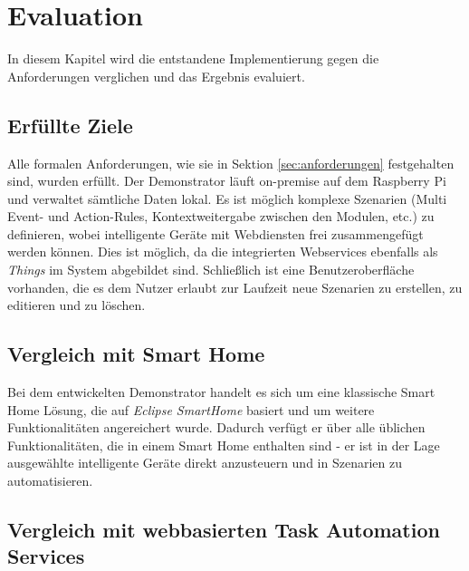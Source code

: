 \chapter{Evaluation}
\label{chap:eval}
In diesem Kapitel wird die entstandene Implementierung gegen die Anforderungen verglichen und das Ergebnis evaluiert.

\section{Erfüllte Ziele}
Alle formalen Anforderungen, wie sie in Sektion \ref{sec:anforderungen} festgehalten sind, wurden erfüllt. Der Demonstrator läuft on-premise auf dem Raspberry Pi und verwaltet sämtliche Daten lokal. Es ist möglich komplexe Szenarien (Multi Event- und Action-Rules, Kontextweitergabe zwischen den Modulen, etc.) zu definieren, wobei intelligente Geräte mit Webdiensten frei zusammengefügt werden können. Dies ist möglich, da die integrierten Webservices ebenfalls als \textit{Things} im System abgebildet sind. Schließlich ist eine Benutzeroberfläche vorhanden, die es dem Nutzer erlaubt zur Laufzeit neue Szenarien zu erstellen, zu editieren und zu löschen.

\section{Vergleich mit Smart Home}
Bei dem entwickelten Demonstrator handelt es sich um eine klassische Smart Home Lösung, die auf \textit{Eclipse SmartHome} basiert und um weitere Funktionalitäten angereichert wurde. Dadurch verfügt er  über alle üblichen Funktionalitäten, die in einem Smart Home enthalten sind - er ist in der Lage ausgewählte intelligente Geräte direkt anzusteuern und in Szenarien zu automatisieren. 

\section{Vergleich mit webbasierten Task Automation Services}


